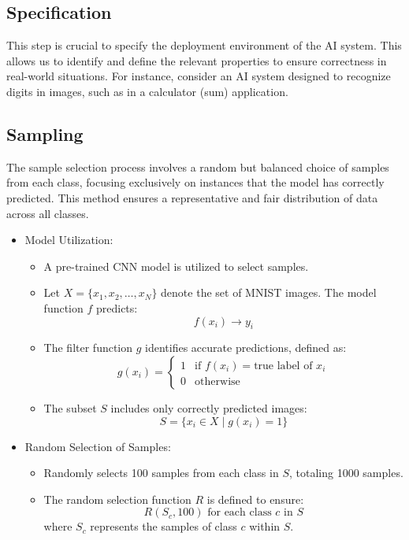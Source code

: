 \documentclass[10pt, conference, a4paper, final]{IEEEtran}
\begin{document}
\subsection{Specification}

This step is crucial to specify the deployment environment of the AI system. This allows us to identify and define the relevant properties to ensure correctness in real-world situations. For instance, consider an AI system designed to recognize digits in images, such as in a calculator (sum)  application. 


\subsection{Sampling}
 The sample selection process involves a random but balanced choice of samples from each class, focusing exclusively on instances that the model has correctly predicted. This method ensures a representative and fair distribution of data across all classes.

\begin{itemize}

    
        \item Model Utilization:
            \begin{itemize}
                \item A pre-trained CNN model is utilized to select samples.
                \item Let \( X = \{x_1, x_2, \dots, x_N\} \) denote the set of MNIST images. The model function \( f \) predicts:
                \[ f(x_i) \rightarrow y_i \]
                \item The filter function \( g \) identifies accurate predictions, defined as:
                \[ g(x_i) = 
                \begin{cases} 
                1 & \text{if } f(x_i) = \text{true label of } x_i \\
                0 & \text{otherwise}
                \end{cases} \]
                \item The subset \( S \) includes only correctly predicted images:
                \[ S = \{x_i \in X \mid g(x_i) = 1\} \]
            \end{itemize}
        \item Random Selection of Samples:
            \begin{itemize}
                \item Randomly selects 100 samples from each class in \( S \), totaling 1000 samples.
                \item The random selection function \( R \) is defined to ensure:
                \[ R(S_c, 100) \text{ for each class } c \text{ in } S \]
                where \( S_c \) represents the samples of class \( c \) within \( S \).
            \end{itemize}

\end{itemize}
\end{document}
